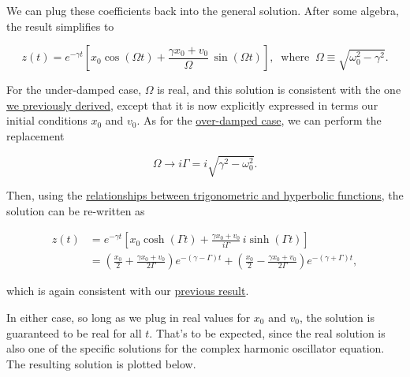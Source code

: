 \documentclass[11pt]{article}
\begin{document}
We can plug these coefficients back into the general solution. After
some algebra, the result simplifies to

\[z(t) = e^{-\gamma t} \left[x_0 \cos(\Omega t) + \frac{\gamma x_0 + v_0}{\Omega} \, \sin(\Omega t)\right], \;\; \mathrm{where}\;\; \Omega \equiv \sqrt{\omega_0^2 - \gamma^2}.\]

For the under-damped case, \(\Omega\) is real, and this solution is
consistent with the one \protect\hyperlink{underdamped}{we previously
derived}, except that it is now explicitly expressed in terms our
initial conditions \(x_0\) and \(v_0\). As for the
\protect\hyperlink{overdamped}{over-damped case}, we can perform the
replacement

\[\Omega \rightarrow i \Gamma = i \sqrt{\gamma^2 - \omega_0^2}.\]

Then, using the \href{00_mathfunctions.ipynb\#hyperbolic}{relationships
between trigonometric and hyperbolic functions}, the solution can be
re-written as

\[\begin{aligned}z(t) &= e^{-\gamma t} \left[x_0 \cosh(\Gamma t) + \frac{\gamma x_0 + v_0}{i\Gamma} \, i \sinh(\Gamma t)\right] \\ &= \left(\frac{x_0}{2} + \frac{\gamma x_0 + v_0}{2\Gamma}\right) e^{-(\gamma - \Gamma) t} + \left(\frac{x_0}{2} - \frac{\gamma x_0 + v_0}{2\Gamma}\right) e^{-(\gamma+\Gamma)t},\end{aligned}\]

which is again consistent with our
\protect\hyperlink{overdamped}{previous result}.

In either case, so long as we plug in real values for \(x_0\) and
\(v_0\), the solution is guaranteed to be real for all \(t\). That's to
be expected, since the real solution is also one of the specific
solutions for the complex harmonic oscillator equation. The resulting
solution is plotted below.
\end{document}
